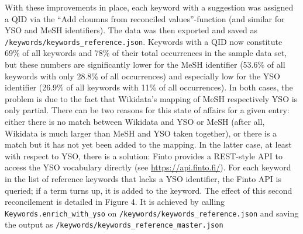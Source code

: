 With these improvements in place, each keyword with a suggestion was
assigned a QID via the ``Add cloumns from reconciled values''-function
(and similar for YSO and MeSH identifiers). The data was then exported
and saved as \texttt{/keywords/keywords\_reference.json}. Keywords with
a QID now constitute 69\% of all keywords and 78\% of their total
occurrences in the sample data set, but these numbers are significantly
lower for the MeSH identifier (53.6\% of all keywords with only 28.8\%
of all occurrences) and especially low for the YSO identifier (26.9\% of
all keywords with 11\% of all occurrences). In both cases, the problem
is due to the fact that Wikidata's mapping of MeSH respectively YSO is
only partial. There can be two reasons for this state of affairs for a
given entry: either there is no match between Wikidata and YSO or MeSH
(after all, Wikidata is much larger than MeSH and YSO taken together),
or there is a match but it has not yet been added to the mapping. In the
latter case, at least with respect to YSO, there is a solution: Finto
provides a REST-style API to access the YSO vocabulary directly (see
\url{https://api.finto.fi/}). For each keyword in the list of reference
keywords that lacks a YSO identifier, the Finto API is queried; if a
term turns up, it is added to the keyword. The effect of this second
reconcilement is detailed in Figure 4. It is achieved by calling
\texttt{Keywords.enrich\_with\_yso} on
\texttt{/keywords/keywords\_reference.json} and saving the output as
\texttt{/keywords/keywords\_reference\_master.json}

\begin{Shaded}
\begin{Highlighting}[]
\OperatorTok{=}\NormalTok{)}
\OperatorTok{=}
\NormalTok{)}
\end{Highlighting}
\end{Shaded}

